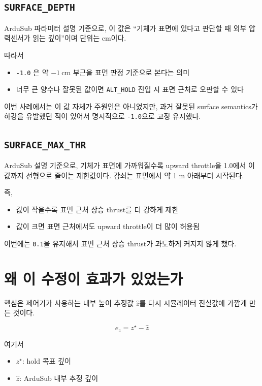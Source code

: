 \documentclass[11pt]{article}
\begin{document}
\subsection{\texttt{SURFACE\_DEPTH}}

ArduSub 파라미터 설명 기준으로, 이 값은 ``기체가 표면에 있다고 판단할 때
외부 압력센서가 읽는 깊이''이며 단위는 cm이다.

따라서

\begin{itemize}[leftmargin=1.5em]
\item \texttt{-1.0} 은 약 \(-1\ \mathrm{cm}\) 부근을 표면 판정 기준으로 본다는 의미
\item 너무 큰 양수나 잘못된 값이면 \texttt{ALT\_HOLD} 진입 시 표면 근처로
      오판할 수 있다
\end{itemize}

이번 사례에서는 이 값 자체가 주원인은 아니었지만, 과거 잘못된 surface
semantics가 하강을 유발했던 적이 있어서 명시적으로 \texttt{-1.0}으로
고정 유지했다.

\subsection{\texttt{SURFACE\_MAX\_THR}}

ArduSub 설명 기준으로, 기체가 표면에 가까워질수록 upward throttle을 1.0에서
이 값까지 선형으로 줄이는 제한값이다. 감쇠는 표면에서 약 1 m 아래부터 시작된다.

즉,

\begin{itemize}[leftmargin=1.5em]
\item 값이 작을수록 표면 근처 상승 thrust를 더 강하게 제한
\item 값이 크면 표면 근처에서도 upward throttle이 더 많이 허용됨
\end{itemize}

이번에는 \texttt{0.1}을 유지해서 표면 근처 상승 thrust가 과도하게 커지지 않게 했다.

\section{왜 이 수정이 효과가 있었는가}

핵심은 제어기가 사용하는 내부 높이 추정값 \(\hat{z}\)를 다시 시뮬레이터 진실값에
가깝게 만든 것이다.

\[
e_z = z^\star - \hat{z}
\]

여기서

\begin{itemize}[leftmargin=1.5em]
\item \(z^\star\): hold 목표 깊이
\item \(\hat{z}\): ArduSub 내부 추정 깊이
\end{itemize}
\end{document}
